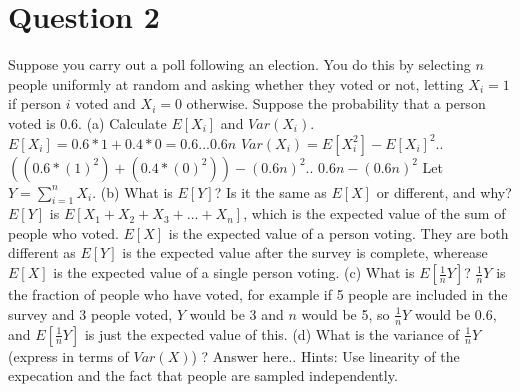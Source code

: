 \documentclass[12pt]{report}
\begin{document}
\section{Question 2}
Suppose you carry out a poll following an election. You do this by selecting $n$ people uniformly at random and asking whether they voted or not, letting $X_i = 1$ if person $i$ voted and $X_i = 0$ otherwise. Suppose the probability that a person voted is $0.6$.
\newline
\newline
(a) Calculate $E[X_i]$ and $Var(X_i)$.
\newline
$E[X_i] = 0.6 * 1 + 0.4 * 0 = 0.6... 0.6n$
\newline
$Var(X_i) = E[X_i^2] - E[X_i]^2$..
\newline
$((0.6 * (1)^2) + (0.4 * (0)^2)) - (0.6n)^2$..
\newline
$0.6n - (0.6n)^2$
\newline
\newline
Let $Y = \sum\limits_{i=1}^n X_i$.
\newline
(b) What is $E[Y]$? Is it the same as $E[X]$ or different, and why?
\newline
$E[Y]$ is $E[X_1 + X_2 + X_3 + ... + X_n]$, which is the expected value of the sum of people who voted. $E[X]$ is the expected value of a person voting. They are both different as $E[Y]$ is the expected value after the survey is complete, wherease $E[X]$ is the expected value of a single person voting. 
\newline
\newline
(c) What is $E[\frac{1}{n} Y]$?
\newline
$\frac{1}{n} Y$ is the fraction of people who have voted, for example if 5 people are included in the survey and 3 people voted, $Y$ would be 3 and $n$ would be 5, so $\frac{1}{n} Y$ would be 0.6, and $E[\frac{1}{n} Y]$ is just the expected value of this. 
\newline
\newline
(d) What is the variance of $\frac{1}{n} Y$ (express in terms of $Var(X)$) ?
\newline
Answer here..
\newline
\newline
Hints: Use linearity of the expecation and the fact that people are sampled independently.
\end{document}
